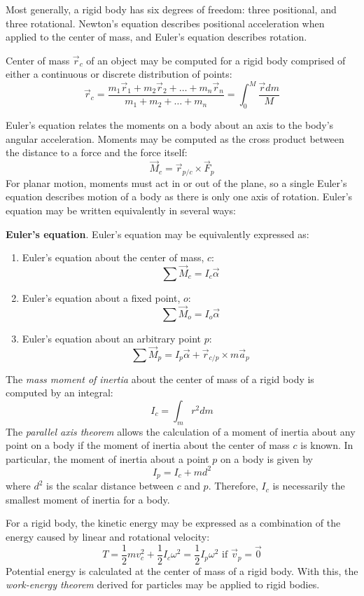 Most generally, a rigid body has six degrees of freedom: three positional, and three rotational. Newton's equation describes positional acceleration when applied to the center of mass, and Euler's equation describes rotation.

Center of mass $\vec{r}_c$ of an object may be computed for a rigid body comprised of either a continuous or discrete distribution of points: \[\vec{r}_c = \frac{m_1\vec{r}_1 + m_2\vec{r}_2+\dots+m_n\vec{r}_n}{m_1+m_2+\dots+m_n} = \int_0^M \frac{\vec{r}dm}{M}\]

Euler's equation relates the moments on a body about an axis to the body's angular acceleration. Moments may be computed as the cross product between the distance to a force and the force itself: \[\vec{M}_c = \vec{r}_{p/c} \times \vec{F}_p\]
For planar motion, moments must act in or out of the plane, so a single Euler's equation describes motion of a body as there is only one axis of rotation. Euler's equation may be written equivalently in several ways:

\begin{shaded}
    \textbf{Euler's equation}. Euler's equation may be equivalently expressed as:
    \begin{enumerate}
        \item Euler's equation about the center of mass, $c$: \[\sum \vec{M}_c = I_c\vec{\alpha}\]
        \item Euler's equation about a fixed point, $o$: \[\sum \vec{M}_o = I_o\vec{\alpha}\]
        \item Euler's equation about an arbitrary point $p$: \[\sum \vec{M}_p = I_p\vec{\alpha} + \vec{r}_{c/p} \times m\vec{a}_p\]
    \end{enumerate}
\end{shaded}
The \textit{mass moment of inertia} about the center of mass of a rigid body is computed by an integral:
\[I_c = \int_m r^2dm\]
The \textit{parallel axis theorem} allows the calculation of a moment of inertia about any point on a body if the moment of inertia about the center of mass $c$ is known. In particular, the moment of inertia about a point $p$ on a body is given by \[I_p = I_c + md^2\] where $d^2$ is the scalar distance between $c$ and $p$. Therefore, $I_c$ is necessarily the smallest moment of inertia for a body.

For a rigid body, the kinetic energy may be expressed as a combination of the energy caused by linear and rotational velocity: \[T = \frac{1}{2}mv_c^2 + \frac{1}{2}I_c\omega^2 = \frac{1}{2}I_p\omega^2\text{ if }\vec{v}_p = \vec{0}\]
Potential energy is calculated at the center of mass of a rigid body. With this, the \textit{work-energy theorem} derived for particles may be applied to rigid bodies.

